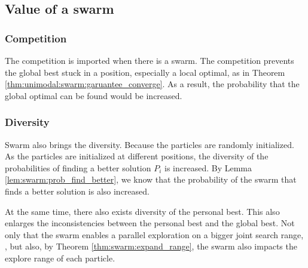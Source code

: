 \subsection{Value of a swarm}




\subsubsection{Competition}

The competition is imported when there is a swarm.
The competition prevents the global best stuck in a position, especially a local optimal, as in Theorem \ref{thm:unimodal:swarm:garuantee_converge}.
As a result, the probability that the global optimal can be found would be increased.

\subsubsection{Diversity}

Swarm also brings the diversity.
Because the particles are randomly initialized.
As the particles are initialized at different positions, the diversity of the probabilities of finding a better solution $ P_{i} $ is increased.
By Lemma \ref{lem:swarm:prob_find_better}, we know that the probability of the swarm that finds a better solution is also increased.

At the same time, there also exists diversity of the personal best.
This also enlarges the inconsistencies between the personal best and the global best.
Not only that the swarm enables a parallel exploration on a bigger joint search range,
, but also, by Theorem \ref{thm:swarm:expand_range}, the swarm also impacts the explore range of each particle.

